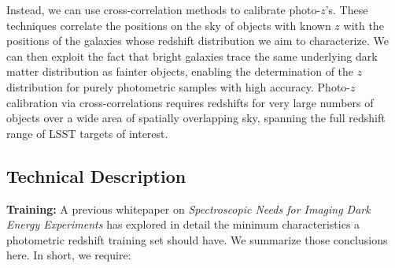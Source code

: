 Instead, we can use cross-correlation methods to calibrate photo-$z$'s.  These techniques correlate
the positions on the sky of objects with known $z$ with the positions of the galaxies whose redshift
distribution we aim to characterize.  We can then exploit the fact that bright galaxies trace the
same underlying dark matter distribution as fainter objects, enabling the determination of the $z$
distribution for purely photometric samples with high accuracy.  Photo-$z$ calibration via
cross-correlations requires redshifts for very large numbers of objects over a wide area of spatially overlapping sky,
spanning the full redshift range of LSST targets of interest.




\subsection{Technical Description }



\label{sec:photoz_design}

{\bf Training:} A previous whitepaper on {\it Spectroscopic Needs for Imaging Dark Energy Experiments} \citep{Newman15} has explored in detail the minimum characteristics a photometric redshift training set should have.  We summarize those conclusions here.  In short, we require:

